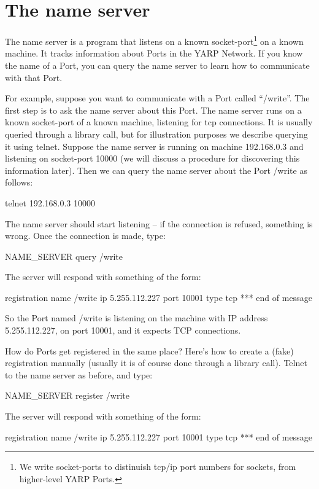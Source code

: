 \documentclass[a4]{article}
\begin{document}
\section{The name server}

The name server is a program that listens on a known socket-port\footnote{We
write socket-ports to distinuish tcp/ip port numbers for sockets, 
from higher-level YARP Ports.}
on a known machine.
%
It tracks information about Ports in the YARP Network.
%
%
If you know the name
of a Port, you can query the name server to learn how to communicate
with that Port.

For example, suppose you want to communicate with a Port called
``/write''.  The first step is to ask the name server about this
Port.  The name server runs on a known socket-port of a known machine,
listening for tcp connections.
It is usually queried through a library call, but for illustration
purposes we describe
querying it using telnet.  Suppose the name server is running on
machine 192.168.0.3 and listening on socket-port 10000 (we will
discuss a procedure for discovering this information later).
Then we can query the name server about the Port /write as follows:


\begin{code}
telnet 192.168.0.3 10000
\end{code}
%
The name server should start listening -- if the connection is refused,
something is wrong.  Once the connection is made, type:
%
\begin{code}
NAME_SERVER query /write
\end{code}
%
The server will respond with something of the form:
%
\begin{code}
registration name /write ip 5.255.112.227 port 10001 type tcp
*** end of message
\end{code}
%
So the Port named /write is listening on the machine with
IP address 5.255.112.227, on port 10001, and it expects TCP
connections.

How do Ports get registered in the same place?  Here's how to create a
(fake) registration
manually (usually it is of course done through a library call).
Telnet to the name server as before, and type:
%
\begin{code}
NAME_SERVER register /write
\end{code}
%
The server will respond with something of the form:
%
\begin{code}
registration name /write ip 5.255.112.227 port 10001 type tcp
*** end of message
\end{code}
\end{document}
